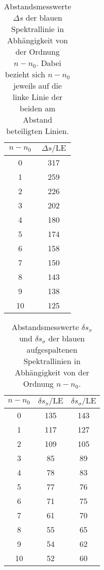 \begin{table}[H]
  \centering
  \caption{Abstandsmesswerte $\Delta s$ der blauen Spektrallinie in Abhängigkeit von der Ordnung $n-n_0$.
  Dabei bezieht sich $n-n_0$ jeweils auf die linke Linie der beiden am Abstand beteiligten Linien.}
  \begin{tabular}{S[table-format=2.0] S[table-format=3.0]}
    \toprule
    {$n-n_0$} & {$\Delta s/\text{LE}$}\\
      & 317 \\
    1  & 259 \\
    2  & 226 \\
    3  & 202 \\
    4  & 180 \\
    5  & 174 \\
    6  & 158 \\
    7  & 150 \\
    8  & 143 \\
    9  & 138 \\
    10 & 125 \\
    \bottomrule
  \end{tabular}
  \label{tab:blueB0}
\end{table}

\begin{table}[H]
  \centering
  \caption{Abstandsmesswerte $\delta s_\pi$ und $\delta s_\sigma$ der blauen aufgespaltenen
  Spektrallinien in Abhängigkeit von der Ordnung $n-n_0$.}
  \begin{tabular}{S[table-format=2.0] S[table-format=3.0] S[table-format=3.0]}
    \toprule
    {$n-n_0$} & {$\delta s_\pi/\text{LE}$} & {$\delta s_\sigma/\text{LE}$}\\
      & 135 & 143 \\
    1  & 117 & 127 \\
    2  & 109 & 105 \\
    3  & 85  & 89  \\
    4  & 78  & 83  \\
    5  & 77  & 76  \\
    6  & 71  & 75  \\
    7  & 61  & 70  \\
    8  & 55  & 65  \\
    9  & 54  & 62  \\
    10 & 52  & 60  \\
    \bottomrule
  \end{tabular}
  \label{tab:blueBpiandsigma}
\end{table}

